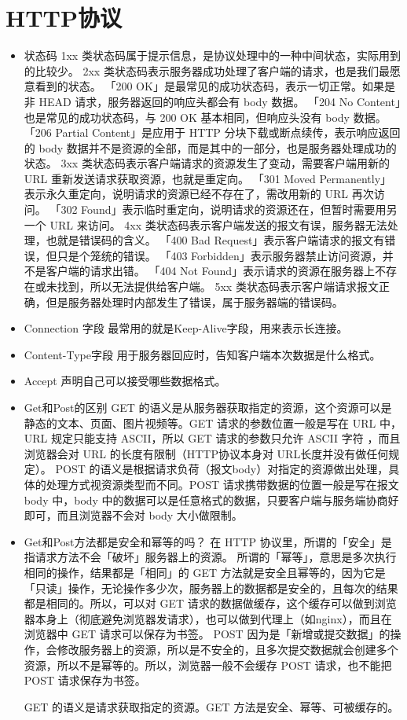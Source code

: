 \documentclass[11pt]{article}
\begin{document}
\section{HTTP协议}
\label{sec:org5b81367}
\begin{itemize}
\item 状态码
1xx 类状态码属于提示信息，是协议处理中的一种中间状态，实际用到的比较少。
2xx 类状态码表示服务器成功处理了客户端的请求，也是我们最愿意看到的状态。
「200 OK」是最常见的成功状态码，表示一切正常。如果是非 HEAD 请求，服务器返回的响应头都会有 body 数据。
「204 No Content」也是常见的成功状态码，与 200 OK 基本相同，但响应头没有 body 数据。
「206 Partial Content」是应用于 HTTP 分块下载或断点续传，表示响应返回的 body 数据并不是资源的全部，而是其中的一部分，也是服务器处理成功的状态。
3xx 类状态码表示客户端请求的资源发生了变动，需要客户端用新的 URL 重新发送请求获取资源，也就是重定向。
「301 Moved Permanently」表示永久重定向，说明请求的资源已经不存在了，需改用新的 URL 再次访问。
「302 Found」表示临时重定向，说明请求的资源还在，但暂时需要用另一个 URL 来访问。
4xx 类状态码表示客户端发送的报文有误，服务器无法处理，也就是错误码的含义。
「400 Bad Request」表示客户端请求的报文有错误，但只是个笼统的错误。
「403 Forbidden」表示服务器禁止访问资源，并不是客户端的请求出错。
「404 Not Found」表示请求的资源在服务器上不存在或未找到，所以无法提供给客户端。
5xx 类状态码表示客户端请求报文正确，但是服务器处理时内部发生了错误，属于服务器端的错误码。

\item Connection 字段
最常用的就是Keep-Alive字段，用来表示长连接。
\item Content-Type字段
用于服务器回应时，告知客户端本次数据是什么格式。
\item Accept
声明自己可以接受哪些数据格式。
\item Get和Post的区别
GET 的语义是从服务器获取指定的资源，这个资源可以是静态的文本、页面、图片视频等。GET 请求的参数位置一般是写在 URL 中，URL 规定只能支持 ASCII，所以 GET 请求的参数只允许 ASCII 字符 ，而且浏览器会对 URL 的长度有限制（HTTP协议本身对 URL长度并没有做任何规定）。
POST 的语义是根据请求负荷（报文body）对指定的资源做出处理，具体的处理方式视资源类型而不同。POST 请求携带数据的位置一般是写在报文 body 中，body 中的数据可以是任意格式的数据，只要客户端与服务端协商好即可，而且浏览器不会对 body 大小做限制。
\item Get和Post方法都是安全和幂等的吗？
在 HTTP 协议里，所谓的「安全」是指请求方法不会「破坏」服务器上的资源。
所谓的「幂等」，意思是多次执行相同的操作，结果都是「相同」的
GET 方法就是安全且幂等的，因为它是「只读」操作，无论操作多少次，服务器上的数据都是安全的，且每次的结果都是相同的。所以，可以对 GET 请求的数据做缓存，这个缓存可以做到浏览器本身上（彻底避免浏览器发请求），也可以做到代理上（如nginx），而且在浏览器中 GET 请求可以保存为书签。
POST 因为是「新增或提交数据」的操作，会修改服务器上的资源，所以是不安全的，且多次提交数据就会创建多个资源，所以不是幂等的。所以，浏览器一般不会缓存 POST 请求，也不能把 POST 请求保存为书签。

GET 的语义是请求获取指定的资源。GET 方法是安全、幂等、可被缓存的。
\end{itemize}
\end{document}
